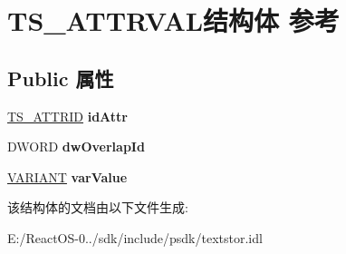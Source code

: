 \hypertarget{struct_t_s___a_t_t_r_v_a_l}{}\section{T\+S\+\_\+\+A\+T\+T\+R\+V\+A\+L结构体 参考}
\label{struct_t_s___a_t_t_r_v_a_l}
\subsection*{Public 属性}
\begin{DoxyCompactItemize}
\item 
\mbox{\label{struct_t_s___a_t_t_r_v_a_l_a1e520d8fc4daed8fca17dc1625b94b84}} 
\hyperlink{interface_g_u_i_d}{T\+S\+\_\+\+A\+T\+T\+R\+ID} {\bfseries id\+Attr}
\item 
\mbox{\label{struct_t_s___a_t_t_r_v_a_l_a47ac4c93c70327df5fe8913314b9cd8b}} 
D\+W\+O\+RD {\bfseries dw\+Overlap\+Id}
\item 
\mbox{\label{struct_t_s___a_t_t_r_v_a_l_a368c02dea1d3e2c9e595af664ca500c9}} 
\hyperlink{structtag_v_a_r_i_a_n_t}{V\+A\+R\+I\+A\+NT} {\bfseries var\+Value}
\end{DoxyCompactItemize}


该结构体的文档由以下文件生成\+:\begin{DoxyCompactItemize}
\item 
E\+:/\+React\+O\+S-\/0../sdk/include/psdk/textstor.\+idl\end{DoxyCompactItemize}
